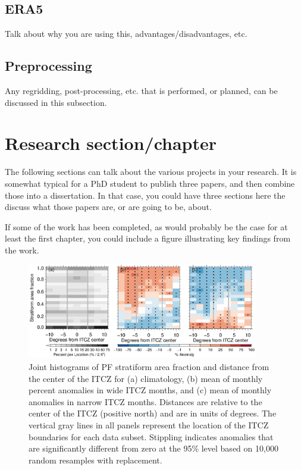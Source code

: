 \documentclass[oneside,letterpaper,12pt]{article}
\begin{document}
\subsection{ERA5}
Talk about why you are using this, advantages/disadvantages, etc.

\subsection{Preprocessing}
Any regridding, post-processing, etc. that is performed, or planned, can be discussed in this subsection.

\section*{Research section/chapter}
The following sections can talk about the various projects in your research.
It is somewhat typical for a PhD student to publish three papers, and then combine those into a dissertation.
In that case, you could have three sections here the discuss what those papers are, or are going to be, about.

If some of the work has been completed, as would probably be the case for at least the first chapter, you could include a figure illustrating key findings from the work.

\begin{figure}[!t]
	\centering
	\includegraphics[width=0.9\textwidth]{./Figures/stratFrac_2d.eps}
	\caption{
		Joint histograms of PF stratiform area fraction and distance from the center of the ITCZ for (a) climatology, (b) mean of monthly percent anomalies in wide ITCZ months, and (c) mean of monthly anomalies in narrow ITCZ months.
		Distances are relative to the center of the ITCZ (positive north) and are in units of degrees.
		The vertical gray lines in all panels represent the location of the ITCZ boundaries for each data subset.
		Stippling indicates anomalies that are significantly different from zero at the 95\% level based on 10,000 random resamples with replacement.
	}
	\label{fig:stratiform2D}
\end{figure}
\end{document}
